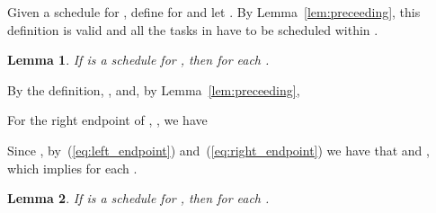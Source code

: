 \documentclass[10pt]{article}
\newenvironment{proof}[1][Proof]
{\par\noindent{\bf #1:} }{\hspace*{\fill}\nolinebreak{}\bigskip\par}
\newtheorem{lemma}{Lemma}
\begin{document}
Given a schedule  for , define  for  and let . By Lemma~\ref{lem:preceeding}, this definition is valid and all the tasks in  have to be scheduled within .

\begin{lemma} \label{lem:time_windows}
If  is a schedule for , then  for each .
\end{lemma}
\begin{proof}
By the definition, , and, by Lemma~\ref{lem:preceeding},

For the right endpoint of , , we have 

Since , by~(\ref{eq:left_endpoint}) and~(\ref{eq:right_endpoint}) we have that  and , which implies  for each .
\end{proof}


\begin{lemma} \label{lem:time_windows_len}
If  is a schedule for , then  for each .
\end{lemma}
\end{document}
